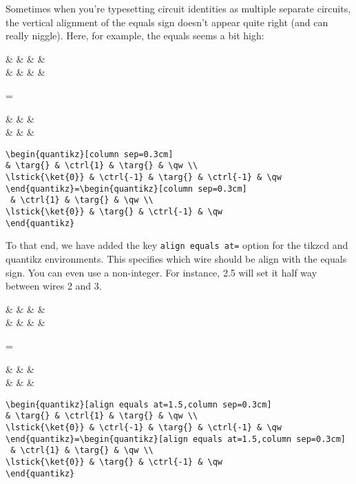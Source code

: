 \documentclass[aps,pra,10pt,nofootinbib]{revtex4}
\begin{document}
Sometimes when you're typesetting circuit identities as multiple separate circuits, the vertical alignment of the equals sign doesn't appear quite right (and can really niggle). Here, for example, the equals seems a bit high:
\begin{Code}
\begin{center}
\begin{quantikz}[column sep=0.3cm]
& \targ{} &  & \targ{} & \qw \\
 &  & \targ{} &  & \qw
\end{quantikz}=\begin{quantikz}[column sep=0.3cm]
 &  & \targ{} & \qw \\
 & \targ{} &  & \qw
\end{quantikz}
\end{center}
\tcblower
\begin{lstlisting}
\begin{quantikz}[column sep=0.3cm]
& \targ{} & \ctrl{1} & \targ{} & \qw \\
\lstick{\ket{0}} & \ctrl{-1} & \targ{} & \ctrl{-1} & \qw
\end{quantikz}=\begin{quantikz}[column sep=0.3cm]
 & \ctrl{1} & \targ{} & \qw \\
\lstick{\ket{0}} & \targ{} & \ctrl{-1} & \qw
\end{quantikz}
\end{lstlisting}
\end{Code}
To that end, we have added the key \texttt{align equals at=} option for the tikzcd and quantikz environments. This specifies which wire should be align with the equals sign. You can even use a non-integer. For instance, 2.5 will set it half way between wires 2 and 3.
\begin{Code}
\begin{center}
\begin{quantikz}[align equals at=1.5,column sep=0.3cm]
& \targ{} &  & \targ{} & \qw \\
 &  & \targ{} &  & \qw
\end{quantikz}=\begin{quantikz}[align equals at=1.5,column sep=0.3cm]
 &  & \targ{} & \qw \\
 & \targ{} &  & \qw
\end{quantikz}
\end{center}
\tcblower
\begin{lstlisting}
\begin{quantikz}[align equals at=1.5,column sep=0.3cm]
& \targ{} & \ctrl{1} & \targ{} & \qw \\
\lstick{\ket{0}} & \ctrl{-1} & \targ{} & \ctrl{-1} & \qw
\end{quantikz}=\begin{quantikz}[align equals at=1.5,column sep=0.3cm]
 & \ctrl{1} & \targ{} & \qw \\
\lstick{\ket{0}} & \targ{} & \ctrl{-1} & \qw
\end{quantikz}
\end{lstlisting}
\end{Code}
\end{document}
